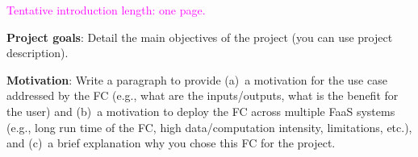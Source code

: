 \textcolor{magenta}{Tentative introduction length: one page.}

\vspace{20 pt}

\textbf{Project goals}: Detail the main objectives of the project (you can use project description).

\vspace{20 pt}

\textbf{Motivation}: Write a paragraph to provide (a)~a motivation for the use case addressed by the FC (e.g., what are the inputs/outputs, what is the benefit for the user) and (b)~a motivation to deploy the FC across multiple FaaS systems (e.g., long run time of the FC, high data/computation intensity, limitations, etc.), and (c)~a brief explanation why you chose this FC for the project.

